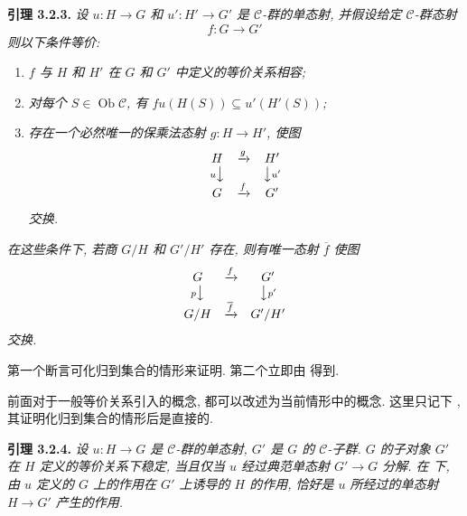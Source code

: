 \medskip
\noindent{}\textbf{引理 3.2.3.}
\textit{设 \(u:H\to G\) 和 \(u':H'\to G'\) 是
\(\mathscr C\)-群的单态射, 并假设给定 \(\mathscr C\)-群态射
\[
  f:G\longrightarrow G'
\]
则以下条件等价:}
\begin{enumerate}
  \item[(i)]
  \textit{\(f\) 与 \(H\) 和 \(H'\) 在 \(G\) 和 \(G'\)
  中定义的等价关系相容;}
  \item[(ii)]
  \textit{对每个 \(S\in\operatorname{Ob}\mathscr C\), 有
  \(fu(H(S))\subseteq u'(H'(S))\);}
  \item[(iii)]
  \textit{存在一个必然唯一的保乘法态射 \(g:H\to H'\), 使图}
  \[
    \begin{array}{ccc}
      H & \xrightarrow{g} & H'\\
      {\scriptstyle u}\big\downarrow && \big\downarrow{\scriptstyle u'}\\
      G & \xrightarrow{f} & G'
    \end{array}
  \]
  \textit{交换.}
\end{enumerate}
\textit{在这些条件下, 若商 \(G/H\) 和 \(G'/H'\) 存在,
则有唯一态射 \(\overline f\) 使图}
\[
  \begin{array}{ccc}
    G & \xrightarrow{f} & G'\\
    {\scriptstyle p}\big\downarrow && \big\downarrow{\scriptstyle p'}\\
    G/H & \xrightarrow{\overline f} & G'/H'
  \end{array}
\]
\textit{交换.}

第一个断言可化归到集合的情形来证明. 第二个立即由
 得到.

前面对于一般等价关系引入的概念, 都可以改述为当前情形中的概念.
这里只记下 ,
其证明化归到集合的情形后是直接的.

\medskip
\noindent{}\textbf{引理 3.2.4.}
\textit{设 \(u:H\to G\) 是 \(\mathscr C\)-群的单态射,
\(G'\) 是 \(G\) 的 \(\mathscr C\)-子群.
\(G\) 的子对象 \(G'\) 在 \(H\) 定义的等价关系下稳定,
当且仅当 \(u\) 经过典范单态射 \(G'\to G\) 分解.
在  下,
由 \(u\) 定义的 \(G\) 上的作用在 \(G'\) 上诱导的 \(H\) 的作用,
恰好是 \(u\) 所经过的单态射 \(H\to G'\) 产生的作用.}

